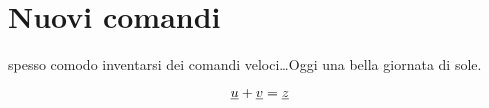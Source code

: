 \section{Nuovi comandi}

\EEE spesso comodo inventarsi dei comandi veloci\dots Oggi \eee una bella giornata di sole.

\[
\underline{u} + \underline{v} = \underline{z}
\]
